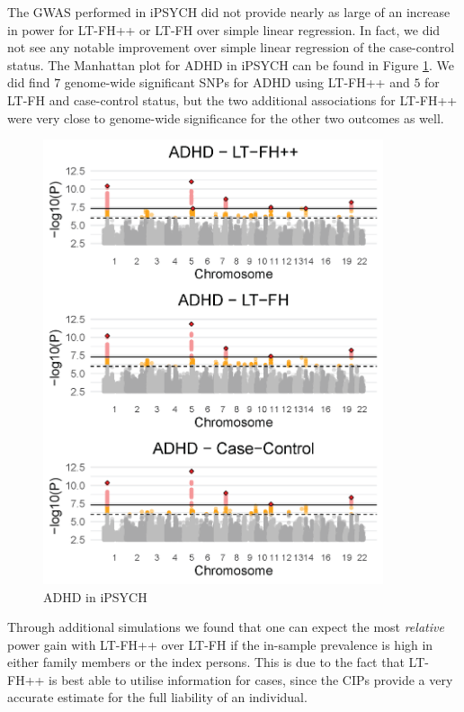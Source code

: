 The GWAS performed in iPSYCH did not provide nearly as large of an increase in power for LT-FH++ or LT-FH over simple linear regression. In fact, we did not see any notable improvement over simple linear regression of the case-control status. The Manhattan plot for ADHD in iPSYCH can be found in Figure \ref{fig:LTFH++_manhattanADHD}. We did find $ 7 $ genome-wide significant SNPs for ADHD using LT-FH++ and $ 5 $ for LT-FH and case-control status, but the two additional associations for LT-FH++ were very close to genome-wide significance for the other two outcomes as well.
\begin{figure}
	\label{fig:LTFH++_manhattanADHD}
	\caption{ADHD in iPSYCH}
	\includegraphics[width=10cm]{results/manhattanPlot_ADHD.png}
\end{figure}
Through additional simulations we found that one can expect the most \textit{relative} power gain with LT-FH++ over LT-FH if the in-sample prevalence is high in either family members or the index persons. This is due to the fact that LT-FH++ is best able to utilise information for cases, since the CIPs provide a very accurate estimate for the full liability of an individual.